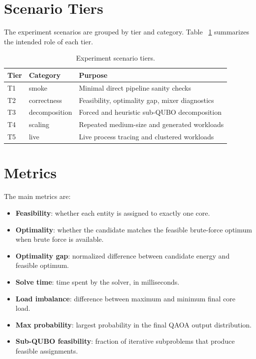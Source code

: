 \documentclass[12pt,a4paper,oneside]{report}
\begin{document}
\section{Scenario Tiers}

The experiment scenarios are grouped by tier and category. Table
~\ref{tab:scenario-tiers} summarizes the intended role of each tier.

\begin{table}[h]
  \centering
  \caption{Experiment scenario tiers.}
  \label{tab:scenario-tiers}
  \begin{tabular}{lll}
    \toprule
    Tier & Category & Purpose \\
    \midrule
    T1 & smoke & Minimal direct pipeline sanity checks \\
    T2 & correctness & Feasibility, optimality gap, mixer diagnostics \\
    T3 & decomposition & Forced and heuristic sub-QUBO decomposition \\
    T4 & scaling & Repeated medium-size and generated workloads \\
    T5 & live & Live process tracing and clustered workloads \\
    \bottomrule
  \end{tabular}
\end{table}

\section{Metrics}

The main metrics are:

\begin{itemize}
  \item \textbf{Feasibility}: whether each entity is assigned to exactly one
  core.
  \item \textbf{Optimality}: whether the candidate matches the feasible
  brute-force optimum when brute force is available.
  \item \textbf{Optimality gap}: normalized difference between candidate energy
  and feasible optimum.
  \item \textbf{Solve time}: time spent by the solver, in milliseconds.
  \item \textbf{Load imbalance}: difference between maximum and minimum final
  core load.
  \item \textbf{Max probability}: largest probability in the final QAOA output
  distribution.
  \item \textbf{Sub-QUBO feasibility}: fraction of iterative subproblems that
  produce feasible assignments.
\end{itemize}
\end{document}
